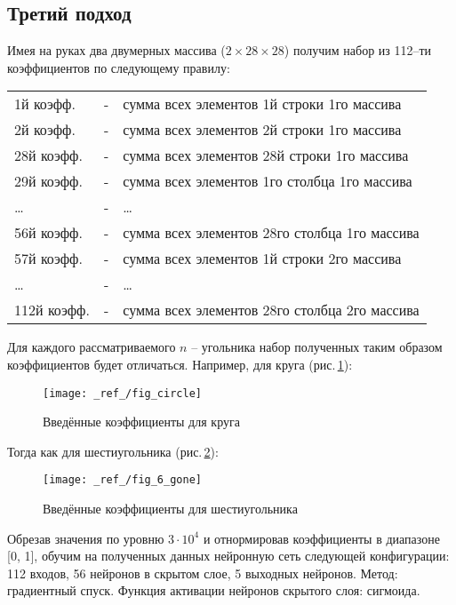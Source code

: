 \documentclass[12pt,a4paper]{article}
\begin{document}
\subsection*{Третий подход}
Имея на руках два двумерных массива ($2\times28\times28$) получим 
набор из 112--ти коэффициентов по следующему правилу: 
\begin{table}[H]
	\center
\begin{tabular}{lcl}
1й коэфф. &-& сумма всех элементов 1й строки 1го массива \\
2й коэфф. &-& сумма всех элементов 2й строки 1го массива \\
28й коэфф. &-& сумма всех элементов 28й строки 1го массива \\
29й коэфф. &-& сумма всех элементов 1го столбца 1го массива \\
\ldots &-& \ldots \\
56й коэфф. &-& сумма всех элементов 28го столбца 1го массива \\
57й коэфф. &-& сумма всех элементов 1й строки 2го массива \\
\ldots &-& \ldots \\
112й коэфф. &-& сумма всех элементов 28го столбца 2го массива
\end{tabular}
\end{table}
\noindent
Для каждого рассматриваемого $n$ -- угольника набор полученных таким образом коэффициентов будет отличаться. Например, для круга (рис.\,\ref{fig:res03}):
\begin{figure}[H]
	\center
	\texttt{[image: \_ref\_/fig\_circle]}
	\caption{Введённые коэффициенты для круга}
	\label{fig:res03}
\end{figure}
\noindent
Тогда как для шестиугольника (рис.\,\ref{fig:res04}):
\begin{figure}[H]
	\center
	\texttt{[image: \_ref\_/fig\_6\_gone]}
	\caption{Введённые коэффициенты для шестиугольника}
	\label{fig:res04}
\end{figure}
\noindent
Обрезав значения по уровню $3\cdot 10^{4}$ и отнормировав коэффициенты в диапазоне [0, 1], обучим на полученных данных нейронную сеть следующей конфигурации: 112 входов, 56 нейронов в скрытом слое, 5 выходных нейронов. Метод: градиентный спуск. Функция активации нейронов скрытого слоя: сигмоида.
\end{document}

